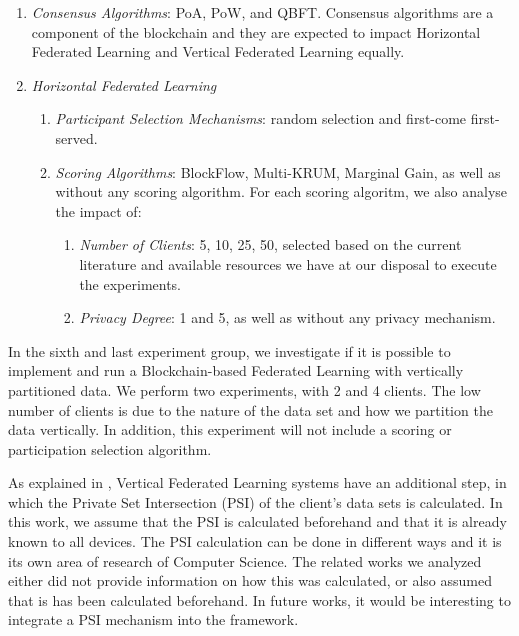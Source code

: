 \begin{enumerate}
    \item \textit{Consensus Algorithms}: PoA, PoW, and QBFT. Consensus algorithms are a component of the blockchain and they are expected to impact Horizontal Federated Learning and Vertical Federated Learning equally.
    
    \item \textit{Horizontal Federated Learning}
    
    \begin{enumerate}
        \item \textit{Participant Selection Mechanisms}: random selection and first-come first-served.
        
        \item \textit{Scoring Algorithms}: BlockFlow, Multi-KRUM, Marginal Gain, as well as without any scoring algorithm. For each scoring algoritm, we also analyse the impact of:
        
        \begin{enumerate}
            \item \textit{Number of Clients}: 5, 10, 25, 50, selected based on the current literature and available resources we have at our disposal to execute the experiments.
            
            \item \textit{Privacy Degree}: 1 and 5, as well as without any privacy mechanism.
        \end{enumerate}
    \end{enumerate}
\end{enumerate}

In the sixth and last experiment group, we investigate if it is possible to implement and run a Blockchain-based Federated Learning with vertically partitioned data. We perform two experiments, with 2 and 4 clients. The low number of clients is due to the nature of the data set and how we partition the data vertically. In addition, this experiment will not include a scoring or participation selection algorithm.

As explained in , Vertical Federated Learning systems have an additional step, in which the Private Set Intersection (PSI) of the client's data sets is calculated. In this work, we assume that the PSI is calculated beforehand and that it is already known to all devices. The PSI calculation can be done in different ways and it is its own area of research of Computer Science. The related works we analyzed either did not provide information on how this was calculated, or also assumed that is has been calculated beforehand. In future works, it would be interesting to integrate a PSI mechanism into the framework.

